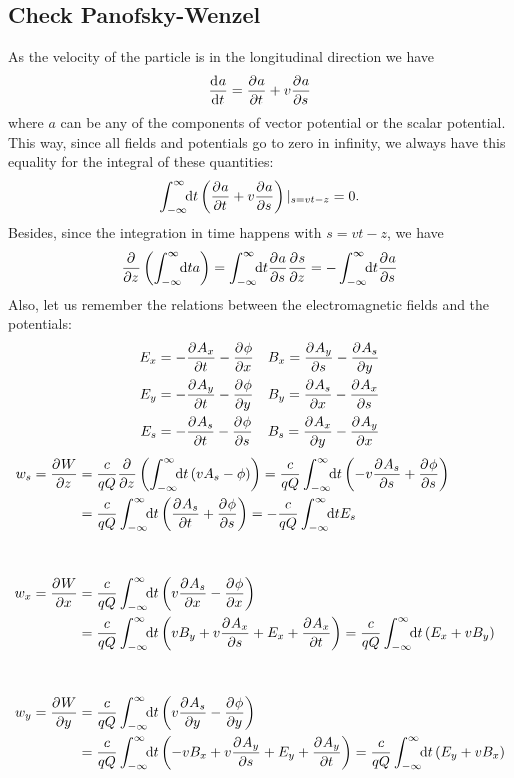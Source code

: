 \begin{apendicesenv}
    \chapter{Check Panofsky-Wenzel}\label{app:check_panofky}

    As the velocity of the particle is in the longitudinal direction we have
    \begin{align}
    	\frac{\mathrm{d}^{{}}a}{\mathrm{d} t^{{}}} = \frac{\partial^{{}}a}{\partial t^{{}}} + v\frac{\partial^{{}}a}{\partial s^{{}}}
    \end{align}
    where $a$ can be any of the components of vector potential or the scalar potential. This way, since all fields and potentials go to zero in infinity, we always have this equality for the integral of these quantities:
    \begin{align}
    	\int_{-\infty}^{\infty}\!\!\text{d}t \left(\frac{\partial^{{}}a}{\partial t^{{}}} + v\frac{\partial^{{}}a}{\partial s^{{}}}\right)|_{s=vt-z} = 0.
    \end{align}
    Besides, since the integration in time happens with $s=vt-z$, we have
    \begin{align}
    	\frac{\partial^{{}}}{\partial z^{{}}}\left(\int_{-\infty}^{\infty}\!\!\text{d}t a\right) =
    	\int_{-\infty}^{\infty}\!\!\text{d}t \frac{\partial^{{}}a}{\partial s^{{}}}\frac{\partial^{{}}s}{\partial z^{{}}} =
    	-\int_{-\infty}^{\infty}\!\!\text{d}t \frac{\partial^{{}}a}{\partial s^{{}}}
    \end{align}
    Also, let us remember the relations between the electromagnetic fields and the potentials:
    \begin{align}
    	E_x &= -\frac{\partial^{{}}A_x}{\partial t^{{}}} - \frac{\partial^{{}}\phi}{\partial x^{{}}} &
        	& B_x = \frac{\partial^{{}}A_y}{\partial s^{{}}} - \frac{\partial^{{}}A_s}{\partial y^{{}}}\\
    	E_y &= -\frac{\partial^{{}}A_y}{\partial t^{{}}} - \frac{\partial^{{}}\phi}{\partial y^{{}}} &
        	& B_y = \frac{\partial^{{}}A_s}{\partial x^{{}}} - \frac{\partial^{{}}A_x}{\partial s^{{}}}\\
    	E_s &= -\frac{\partial^{{}}A_s}{\partial t^{{}}} - \frac{\partial^{{}}\phi}{\partial s^{{}}} &
        	& B_s = \frac{\partial^{{}}A_x}{\partial y^{{}}} - \frac{\partial^{{}}A_y}{\partial x^{{}}}
    \end{align}
    \begin{align}
    	w_s = \derpar{W}{z}\nonumber
    	&= \frac{c}{qQ} \derpar{}{z}\left(\infint{t}{\left(vA_s-\phi\right)}\right)
    	= \frac{c}{qQ} \infint{t}{\left(-v\derpar{A_s}{s}+\derpar{\phi}{s}\right)}\\
    	&= \frac{c}{qQ} \infint{t}{\left(\derpar{A_s}{t}+\derpar{\phi}{s}\right)}
    	=-\frac{c}{qQ} \infint{t}{E_s}\\[1cm]
    	w_x = \derpar{W}{x}\nonumber
    	&=\frac{c}{qQ} \infint{t}{\left(v\derpar{A_s}{x}-\derpar{\phi}{x}\right)}\\
    	&= \frac{c}{qQ} \infint{t}{\left(vB_y+v\derpar{A_x}{s} + E_x + \derpar{A_x}{t}\right)}
    	= \frac{c}{qQ} \infint{t}{\left(E_x + vB_y\right)}\\[1cm]
    	w_y = \derpar{W}{y}\nonumber
    	&=\frac{c}{qQ} \infint{t}{\left(v\derpar{A_s}{y}-\derpar{\phi}{y}\right)}\\
    	&=\frac{c}{qQ} \infint{t}{\left(-vB_x+v\derpar{A_y}{s} + E_y + \derpar{A_y}{t}\right)}
    	= \frac{c}{qQ} \infint{t}{\left(E_y + vB_x\right)}
    \end{align}



\end{apendicesenv}
